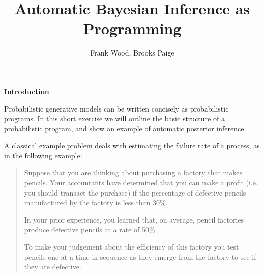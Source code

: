 \documentclass[11pt,reqno]{amsart}
\title{Automatic Bayesian Inference as Programming}
\author{Frank Wood, Brooks Paige}
\newcommand{\+}[1]{\ensuremath{{\mathbf{#1}}}}
\begin{document}
\maketitle


{\bf Introduction}

Probabilistic generative models can be written concisely as probabilistic programs.
In this short exercise we will outline the basic structure of a probabilistic program, and show an example of automatic posterior inference.

A classical example problem deals with estimating the failure rate of a process, as in the following example:
\begin{quote}
Suppose that you are thinking
about purchasing a factory that makes pencils. Your accountants
have determined that you can make a profit 
(i.e. you should transact the purchase) if the percentage of defective pencils
manufactured by the factory is less than 30\%.

In your prior experience, you learned that, on average, pencil
factories produce defective pencils at a rate of 50\%.

To make your judgement about the efficiency of this factory you
test pencils one at a time in sequence as they emerge from the
factory to see if they are defective.
\end{quote}
\end{document}
